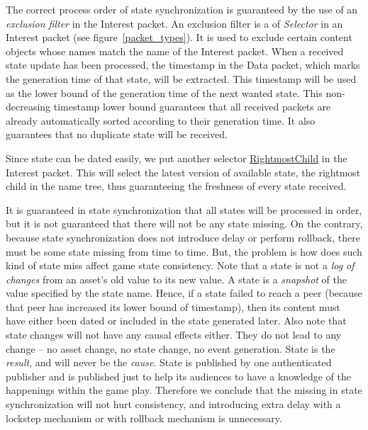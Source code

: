 The correct process order of state synchronization is guaranteed by the use of an \emph{exclusion filter} in the Interest packet. An exclusion filter is a of \emph{Selector} in an Interest packet (see figure~\ref{packet_types}). It is used to exclude certain content objects whose names match the name of the Interest packet. When a received state update has been processed, the timestamp in the Data packet, which marks the generation time of that state, will be extracted. This timestamp will be used as the lower bound of the generation time of the next wanted state. This non-decreasing timestamp lower bound guarantees that all received packets are already automatically sorted according to their generation time. It also guarantees that no duplicate state will be received.

Since state can be dated easily, we put another selector \url{RightmostChild} in the Interest packet. This will select the latest version of available state, the rightmost child in the name tree, thus guaranteeing the freshness of every state received.

It is guaranteed in state synchronization that all states will be processed in order, but it is not guaranteed that there will not be any state missing. On the contrary, because state synchronization does not introduce delay or perform rollback, there must be some state missing from time to time. But, the problem is how does such kind of state miss affect game state consistency. Note that a state is not a \emph{log of changes} from an asset's old value to its new value. A state is a \emph{snapshot} of the value specified by the state name. Hence, if a state failed to reach a peer (because that peer has increased its lower bound of timestamp), then its content must have either been dated or included in the state generated later. Also note that state changes will not have any causal effects either. They do not lead to any change -- no asset change, no state change, no event generation. State is the \emph{result}, and will never be the \emph{cause}. State is published by one authenticated publisher and is published just to help its audiences to have a knowledge of the happenings within the game play. Therefore we conclude that the missing in state synchronization will not hurt consistency, and introducing extra delay with a lockstep mechanism or with rollback mechanism is unnecessary.


